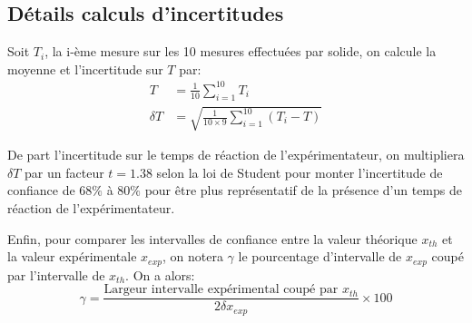 \documentclass[12pt]{article}
\begin{document}
\subsection{Détails calculs d'incertitudes}
\label{incertitude}

Soit $T_i$, la i-ème mesure sur les 10 mesures effectuées par solide, on calcule la moyenne et l'incertitude sur $T$ par:
\begin{align*}
    T &= \frac{1}{10} \sum_{i=1}^{10} T_i \\
    \delta T &= \sqrt{\frac{1}{10 \times 9} \sum_{i=1}^{10} (T_i - T)}
\end{align*}

De part l'incertitude sur le temps de réaction de l'expérimentateur, on multipliera $\delta T$ par un facteur $t = 1.38$ selon la loi de Student pour monter
l'incertitude de confiance de $68\%$ à $80\%$ pour être plus représentatif de la présence d'un temps de réaction de l'expérimentateur.

Enfin, pour comparer les intervalles de confiance entre la valeur théorique $x_{th}$ et la valeur expérimentale $x_{exp}$, on notera $\gamma$ le pourcentage
d'intervalle de $x_{exp}$ coupé par l'intervalle de $x_{th}$. On a alors:
\begin{equation}
    \gamma = \frac{\text{Largeur intervalle expérimental coupé par }x_{th}}{2\delta x_{exp}} \times 100
\end{equation}
\end{document}
